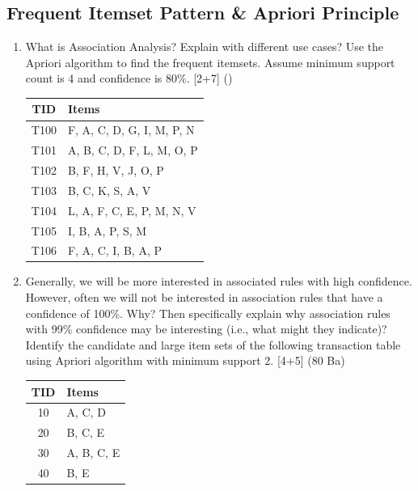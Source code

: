 \documentclass[12pt]{article}
\begin{document}
  \subsection{Frequent Itemset Pattern \& Apriori Principle}
    \begin{enumerate}[topsep=0pt, noitemsep]
      \item What is Association Analysis? Explain with different use cases? Use the Apriori algorithm to find the frequent itemsets. Assume minimum support count is 4 and confidence is 80\%. \hfill [2+7] ()\\
        \small
        \begin{tabular}{|c|l|}
          \hline
          TID & Items \\ \hline
          T100 & F, A, C, D, G, I, M, P, N \\ \hline
          T101 & A, B, C, D, F, L, M, O, P \\ \hline
          T102 & B, F, H, V, J, O, P \\ \hline
          T103 & B, C, K, S, A, V \\ \hline
          T104 & L, A, F, C, E, P, M, N, V \\ \hline
          T105 & I, B, A, P, S, M \\ \hline
          T106 & F, A, C, I, B, A, P \\ \hline
        \end{tabular}
        \normalsize

      \item Generally, we will be more interested in associated rules with high confidence. However, often we will not be interested in association rules that have a confidence of 100\%. Why? Then specifically explain why association rules with 99\% confidence may be interesting (i.e., what might they indicate)? Identify the candidate and large item sets of the following transaction table using Apriori algorithm with minimum support 2. \hfill [4+5] (80 Ba)\\
        \small
        \begin{tabular}{|c|l|}
          \hline
          TID & Items \\ \hline
          10 & A, C, D \\ \hline
          20 & B, C, E \\ \hline
          30 & A, B, C, E \\ \hline
          40 & B, E \\ \hline
        \end{tabular}
        \normalsize


\end{enumerate}
\end{document}
